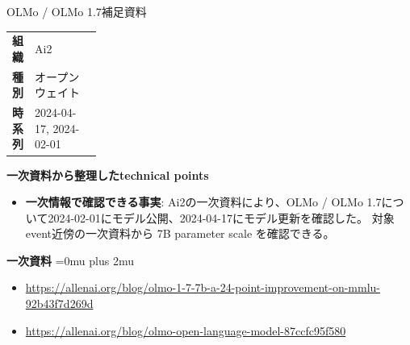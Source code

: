 \begin{technicalnote}{OLMo / OLMo 1.7}{補足資料}
\begingroup
\begin{tabularx}{\linewidth}{@{}>{\bfseries}p{0.22\linewidth}X@{}}
組織 & Ai2 \\
種別 & オープンウェイト \\
時系列 & 2024-04-17, 2024-02-01 \\
\end{tabularx}
\smallskip
\begin{minipage}{\linewidth}
{\bfseries 一次資料から整理したtechnical points}
\begin{itemize}[leftmargin=1.5em,itemsep=0.35em]
\item \textbf{一次情報で確認できる事実}: Ai2の一次資料により、OLMo / OLMo 1.7について2024-02-01にモデル公開、2024-04-17にモデル更新を確認した。 対象event近傍の一次資料から 7B parameter scale を確認できる。
\end{itemize}
\begin{minipage}{\linewidth}
\begin{samepage}
{\bfseries 一次資料}
\begingroup\sloppy
\Urlmuskip=0mu plus 2mu\relax
\begin{itemize}[leftmargin=1.5em,itemsep=0.25em]
\item {\scriptsize\url{https://allenai.org/blog/olmo-1-7-7b-a-24-point-improvement-on-mmlu-92b43f7d269d}}
\item {\scriptsize\url{https://allenai.org/blog/olmo-open-language-model-87ccfc95f580}}
\end{itemize}
\endgroup
\end{samepage}
\end{minipage}
\end{minipage}
\endgroup
\end{technicalnote}
\medskip
